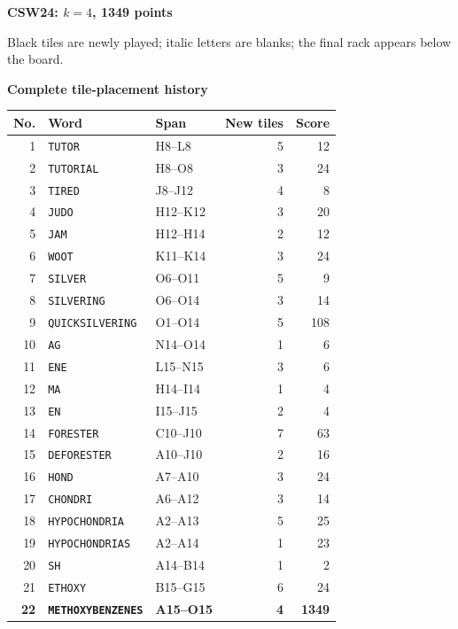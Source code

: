 \documentclass[letterpaper]{article}
\begin{document}
\begin{center}
{\fontsize{11}{12}\selectfont\bfseries CSW24: $k=4$, 1349 points\par}
\vspace{2pt}
\par
\vspace{1pt}
{\fontsize{7.2}{8}\selectfont Black tiles are newly played; italic letters are blanks; the final rack appears below the board.\par}
\vspace{2pt}
{\fontsize{8.5}{9}\selectfont\bfseries Complete tile-placement history\par}
\end{center}
\begin{center}
\fontsize{8}{8.3}\selectfont
\setlength{\tabcolsep}{4pt}
\renewcommand{\arraystretch}{0.84}
\begin{tabular}{@{}rllrr@{}}\toprule
No. & Word & Span & New tiles & Score\\
\midrule
1 & \texttt{TUTOR} & H8--L8 & 5 & 12\\
2 & \texttt{TUTORIAL} & H8--O8 & 3 & 24\\
3 & \texttt{TIRED} & J8--J12 & 4 & 8\\
4 & \texttt{JUDO} & H12--K12 & 3 & 20\\
5 & \texttt{JAM} & H12--H14 & 2 & 12\\
6 & \texttt{WOOT} & K11--K14 & 3 & 24\\
7 & \texttt{SILVER} & O6--O11 & 5 & 9\\
8 & \texttt{SILVERING} & O6--O14 & 3 & 14\\
9 & \texttt{QUICKSILVERING} & O1--O14 & 5 & 108\\
10 & \texttt{AG} & N14--O14 & 1 & 6\\
11 & \texttt{ENE} & L15--N15 & 3 & 6\\
12 & \texttt{MA} & H14--I14 & 1 & 4\\
13 & \texttt{EN} & I15--J15 & 2 & 4\\
14 & \texttt{FORESTER} & C10--J10 & 7 & 63\\
15 & \texttt{DEFORESTER} & A10--J10 & 2 & 16\\
16 & \texttt{HOND} & A7--A10 & 3 & 24\\
17 & \texttt{CHONDRI} & A6--A12 & 3 & 14\\
18 & \texttt{HYPOCHONDRIA} & A2--A13 & 5 & 25\\
19 & \texttt{HYPOCHONDRIAS} & A2--A14 & 1 & 23\\
20 & \texttt{SH} & A14--B14 & 1 & 2\\
21 & \texttt{ETHOXY} & B15--G15 & 6 & 24\\
\midrule
\textbf{22} & \textbf{\texttt{METHOXYBENZENES}} & \textbf{A15--O15} & \textbf{4} & \textbf{1349}\\
\bottomrule\end{tabular}
\end{center}
\end{document}

